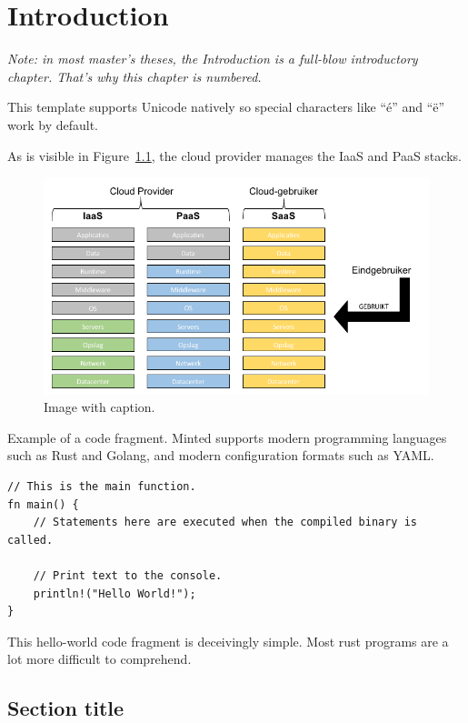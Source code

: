 \chapter{Introduction}
\label{chap:intro}

\textit{Note: in most master's theses, the Introduction is a full-blow introductory chapter. That's why this chapter is numbered.}

This template supports Unicode natively so special characters like ``é'' and ``ë'' work by default.

As is visible in Figure~\ref{fig:cloud_rollen}, the cloud provider manages the IaaS and PaaS stacks.

\begin{figure}[h]
	\centering
	\includegraphics[width=\textwidth]{images/cloud_rollen.png}
	\caption{Image with caption.}
	\label{fig:cloud_rollen}
\end{figure}

Example of a code fragment. Minted supports modern programming languages such as Rust and Golang, and modern configuration formats such as YAML.

\begin{listing}[ht]
\begin{verbatim}
// This is the main function.
fn main() {
    // Statements here are executed when the compiled binary is called.

    // Print text to the console.
    println!("Hello World!");
}
\end{verbatim}
\caption{This hello-world code fragment is deceivingly simple. Most rust programs are a lot more difficult to comprehend.}
\end{listing}



\section{Section title}

